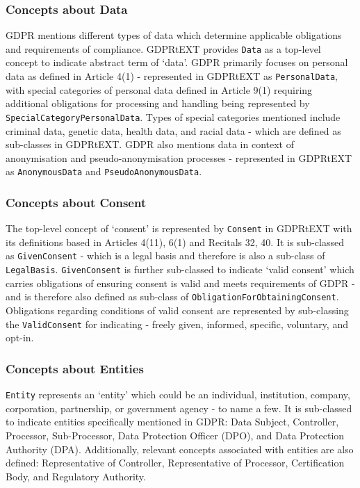 \subsubsection{Concepts about Data}
GDPR mentions different types of data which determine applicable obligations and requirements of compliance. GDPRtEXT provides \texttt{Data} as a top-level concept to indicate abstract term of `data'.
GDPR primarily focuses on personal data as defined in Article 4(1) -  represented in GDPRtEXT as \texttt{PersonalData}, with special categories of personal data defined in Article 9(1) requiring additional obligations for processing and handling being represented by \texttt{SpecialCategoryPersonalData}. Types of special categories mentioned include criminal data, genetic data, health data, and racial data - which are defined as sub-classes in GDPRtEXT.
GDPR also mentions data in context of anonymisation and pseudo-anonymisation processes - represented in GDPRtEXT as \texttt{AnonymousData} and \texttt{PseudoAnonymousData}.

\subsubsection{Concepts about Consent}
The top-level concept of `consent' is represented by \texttt{Consent} in GDPRtEXT with its definitions based in Articles 4(11), 6(1) and Recitals 32, 40. It is sub-classed as \texttt{GivenConsent} - which is a legal basis and therefore is also a sub-class of \texttt{LegalBasis}. \texttt{GivenConsent} is further sub-classed to indicate `valid consent' which carries obligations of ensuring consent is valid and meets requirements of GDPR - and is therefore also defined as sub-class of \texttt{ObligationForObtainingConsent}. Obligations regarding conditions of valid consent are represented by sub-classing the \texttt{ValidConsent} for indicating - freely given, informed, specific, voluntary, and opt-in.

\subsubsection{Concepts about Entities}
\texttt{Entity} represents an `entity' which could be an individual, institution, company, corporation, partnership, or government agency - to name a few. 
It is sub-classed to indicate entities specifically mentioned in GDPR: Data Subject, Controller, Processor, Sub-Processor, Data Protection Officer (DPO), and Data Protection Authority (DPA). Additionally, relevant concepts associated with entities are also defined:  Representative of Controller, Representative of Processor, Certification Body, and Regulatory Authority.

